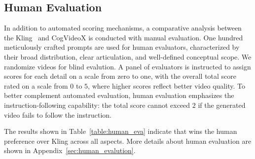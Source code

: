 





\subsection{Human Evaluation}
In addition to automated scoring mechanisms, a comparative analysis between the Kling~\citep{kling} and CogVideoX is conducted with manual evaluation. 
One hundred meticulously crafted prompts are used for human evaluators, characterized by their broad distribution, clear articulation, and well-defined conceptual scope. 
We randomize videos for blind evalution. 
A panel of evaluators is instructed to assign scores for each detail on a scale from zero to one, with the overall total score rated on a scale from $0$ to $5$, where higher scores reflect better video quality. 
To better complement automated evaluation, human evaluation emphasizes the instruction-following capability: the total score cannot exceed $2$ if the generated video fails to follow the instruction.

The results shown in Table~\ref{table:human_eva} indicate that \model wins the human preference over Kling across all aspects. 
More details about human evaluation are shown in Appendix~\ref{sec:human_evalution}.






